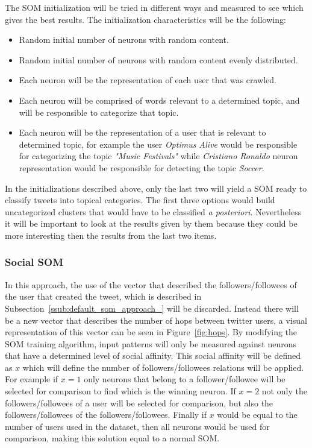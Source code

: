 The SOM initialization will be tried in different ways and measured to see which gives the best results. The initialization characteristics will be the following:
\begin{itemize}
  \item Random initial number of neurons with random content.
  \item Random initial number of neurons with random content evenly distributed.
  \item Each neuron will be the representation of each user that was crawled.
  \item Each neuron will be comprised of words relevant to a determined topic, and will be responsible to categorize that topic.
  \item Each neuron will be the representation of a user that is relevant to determined topic, for example the user \emph{Optimus Alive} would be responsible for categorizing the topic \textit{"Music Festivals"}  while \emph{Cristiano Ronaldo} neuron representation would be responsible for detecting the topic \emph{Soccer}.
\end{itemize}

In the initializations described above, only the last two will yield a SOM ready to classify tweets into topical categories. The first three options would build uncategorized clusters that would have to be classified \emph{a posteriori}. Nevertheless it will be important to look at the results given by them because they could be more interesting then the results from the last two items.

\subsubsection{Social SOM} %
\label{ssub:social_som}
In this approach, the use of the vector that described the followers/followees of the user that created the tweet, which is described  in Subsection~\ref{ssub:default_som_approach_} will be discarded. Instead there will be a new vector that describes the number of hops between twitter users, a visual representation of this vector can be seen in Figure~\ref{fig:hops}.
By modifying the SOM training algorithm, input patterns will only be measured against neurons that have a determined level of social affinity. This social affinity will be defined as \(x\) which will define the number of followers/followees relations will be applied. For example if \(x = 1\) only neurons that belong to a follower/followee will be selected for comparison to find which is the winning neuron. If \(x = 2\) not only the followers/followees of a user will be selected for comparison, but also the followers/followees of the followers/followees. Finally if \(x\) would be equal to the number of users used in the dataset, then all neurons would be used for comparison, making this solution equal to a normal SOM.

